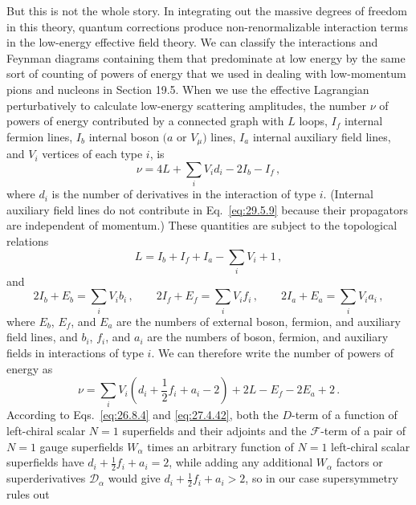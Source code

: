 But this is not the whole story. In integrating out the massive degrees of
freedom in this theory, quantum corrections produce non-renormalizable
interaction terms in the low-energy effective field theory. We can classify
the interactions and Feynman diagrams containing them that predominate at
low energy by the same sort of counting of powers of energy that we used in
dealing with low-momentum pions and nucleons in Section 19.5. When we use the
effective Lagrangian perturbatively to calculate low-energy scattering
amplitudes, the number \(\nu\) of powers of energy contributed by a connected
graph with \(L\) loops, \(I_f\) internal fermion lines, \(I_b\) internal boson
\((a\) or \(V_\mu)\) lines, \(I_a\) internal auxiliary field lines, and
\(V_i\) vertices of each type \(i\), is
\begin{equation}
  \nu=4L+\sum_iV_id_i-2I_b-I_f\,,
  \tag{29.5.9}\label{eq:29.5.9}
\end{equation}
where \(d_i\) is the number of derivatives in the interaction of type \(i\).
(Internal auxiliary field lines do not contribute in Eq.~\eqref{eq:29.5.9}
because their propagators are independent of momentum.) These quantities
are subject to the topological relations
\begin{equation}
  L=I_b+I_f+I_a-\sum_iV_i+1\,,
  \tag{29.5.10}\label{eq:29.5.10}
\end{equation}
and
\begin{equation}
  2I_b+E_b=\sum_iV_ib_i\,,
  \qquad
  2I_f+E_f=\sum_iV_if_i\,,
  \qquad
  2I_a+E_a=\sum_iV_ia_i\,,
  \tag{29.5.11}\label{eq:29.5.11}
\end{equation}
where \(E_b\), \(E_f\), and \(E_a\) are the numbers of external boson,
fermion, and auxiliary field lines, and \(b_i\), \(f_i\), and \(a_i\) are the
numbers of boson, fermion, and auxiliary fields in interactions of type
\(i\). We can therefore write the number of powers of energy as
\begin{equation}
  \nu=\sum_iV_i\left(d_i+\frac12f_i+a_i-2\right)
  +2L-E_f-2E_a+2\,.
  \tag{29.5.12}\label{eq:29.5.12}
\end{equation}
According to Eqs.~\eqref{eq:26.8.4} and \eqref{eq:27.4.42}, both the
\(D\)-term of a function of left-chiral scalar \(N=1\) superfields and
their adjoints and the \(\mathcal{F}\)-term of a pair of \(N=1\) gauge
superfields \(W_\alpha\) times an arbitrary function of \(N=1\) left-chiral
scalar superfields have \(d_i+\tfrac12f_i+a_i=2\), while adding any
additional \(W_\alpha\) factors or superderivatives \(\mathcal{D}_\alpha\)
would give \(d_i+\tfrac12f_i+a_i>2\), so in our case supersymmetry rules out
